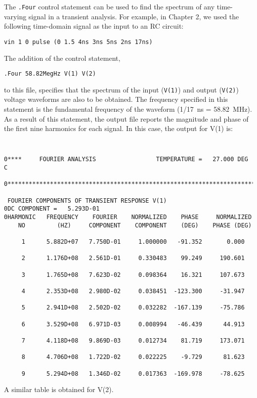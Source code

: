 The {\tt .Four} control statement can be used to find the spectrum
of any time-varying signal in a transient analysis.
For example, in Chapter 2, we used
the following time-domain signal as the input to an RC circuit:
\par\noindent
\centerline{}
\par\noindent
\begin{center}
{\tt vin 1 0 pulse (0 1.5 4ns 3ns 5ns 2ns 17ns)}
\end{center}
The addition of the control statement,
\begin{center}
{\tt .Four 58.82MegHz V(1) V(2)}
\end{center}
to this file,
specifies that the spectrum of the input ({\tt V(1)}) and output ({\tt V(2)})
voltage waveforms
are also to be obtained.  The frequency specified in this statement is the
fundamental frequency of the waveform (1/17~ns = 58.82~MHz).
As a result of this statement, the output file reports the magnitude
and phase
of the first nine harmonics for each signal.  In this case, the output
for V(1) is:
\begin{center}
{\tt
\begin{verbatim}
0****     FOURIER ANALYSIS                 TEMPERATURE =   27.000 DEG C

0***********************************************************************

 FOURIER COMPONENTS OF TRANSIENT RESPONSE V(1)
0DC COMPONENT =   5.293D-01
0HARMONIC   FREQUENCY    FOURIER    NORMALIZED    PHASE     NORMALIZED
    NO         (HZ)     COMPONENT    COMPONENT    (DEG)    PHASE (DEG)

     1      5.882D+07   7.750D-01     1.000000   -91.352       0.000

     2      1.176D+08   2.561D-01     0.330483    99.249     190.601

     3      1.765D+08   7.623D-02     0.098364    16.321     107.673

     4      2.353D+08   2.980D-02     0.038451  -123.300     -31.947

     5      2.941D+08   2.502D-02     0.032282  -167.139     -75.786

     6      3.529D+08   6.971D-03     0.008994   -46.439      44.913

     7      4.118D+08   9.869D-03     0.012734    81.719     173.071

     8      4.706D+08   1.722D-02     0.022225    -9.729      81.623

     9      5.294D+08   1.346D-02     0.017363  -169.978     -78.625
\end{verbatim} }
\end{center}
A similar table is obtained for V(2).


